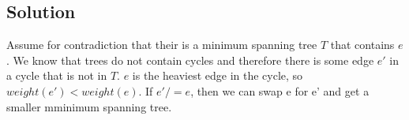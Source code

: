 \subsection*{Solution}

Assume for contradiction that their is a minimum spanning tree $T$ that contains $e$. We know that trees do not contain cycles and therefore there is some edge $e'$ in a cycle that is not in $T$. $e$ is the heaviest edge in the cycle, so $weight(e') < weight(e)$. If $e' /= e$, then we can swap e for e' and get a smaller mminimum spanning tree.
